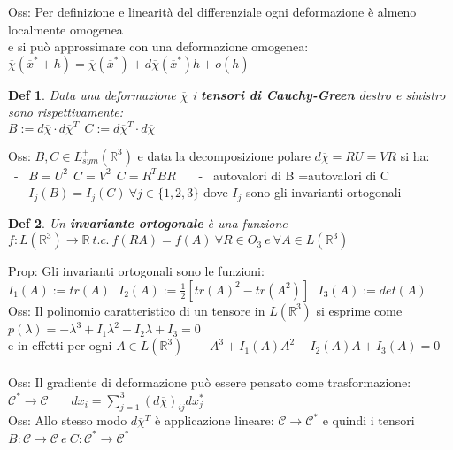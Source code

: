 \documentclass{article}
\theoremstyle{unnumbered}
\newtheorem* {theoremT}{Def}
\theoremstyle{unnumbered1}
\newenvironment{defi}{\begin{gBox}\begin{theoremT}}{\end{theoremT}\end{gBox}}
\begin{document}
%
%
%
Oss: Per definizione e linearità del differenziale ogni deformazione è almeno localmente omogenea\\
\phantom{Oss: }e si può approssimare con una deformazione omogenea: \ $\overline{\chi}(\overline{x}^*+\overline{h})=\overline{\chi}(\overline{x}^*)+d\overline{\chi}(\overline{x}^*)\overline{h} +o(\overline{h})$ \\
%
%
%
\begin{defi}
Data una deformazione $\overline{\chi}$ i \textbf{tensori di Cauchy-Green} destro e sinistro sono rispettivamente:\\
\phantom{DEF: } $B:=d\overline{\chi}\cdot d\overline{\chi}^T \ \ C:=d\overline{\chi}^T\cdot d\overline{\chi} $
\end{defi}
%
Oss: $B,C \in L_{sym}^+(\mathbb{R}^3)$ e data la decomposizione polare $d\overline{\chi}=RU = VR$ si ha: \\
\ - \ $B=U^2 \ \ C=V^2 \ \ C=R^TBR$ \ \
\ - \ autovalori di B =autovalori di C\\
\ - \ $I_j(B)=I_j(C)\ \forall j\in \{1,2,3\}$ dove $I_j$ sono gli invarianti ortogonali \\
%
\begin{defi}
Un \textbf{invariante ortogonale} è una funzione $f:L(\mathbb{R}^3)\rightarrow\mathbb{R} \ t.c. \ f(RA)=f(A) \ \forall R\in O_3 \ e \ \forall A \in L(\mathbb{R}^3)$
\end{defi}
%
Prop: Gli invarianti ortogonali sono le funzioni: \ $I_1(A):=tr(A) \ \ \ I_2(A):=\frac{1}{2}[tr(A)^2-tr(A^2)] \ \ \ I_3(A):=det(A)$ \\
%
Oss: Il polinomio caratteristico di un tensore in $L(\mathbb{R}^3)$ si esprime come $p(\lambda)=-\lambda^3+I_1\lambda^2-I_2\lambda+I_3=0$\\
\phantom{Oss: }e in effetti per ogni $A\in L(\mathbb{R}^3)$ \ \ $-A^3+I_1(A)A^2-I_2(A)A+I_3(A)=0$\\ \\
%
%
%
Oss: Il gradiente di deformazione può essere pensato come trasformazione: $\mathcal{C}^*\rightarrow\mathcal{C}$ \ \ \ $dx_i=\sum_{j=1}^3(d\overline{\chi})_{ij} dx^*_j$ \\
Oss: Allo stesso modo $d\overline{\chi}^T$ è applicazione lineare: $\mathcal{C}\rightarrow\mathcal{C}^*$ e quindi i tensori \ \ $B: \mathcal{C}\rightarrow\mathcal{C} \ e \ C: \mathcal{C}^*\rightarrow\mathcal{C}^*$\\  
%
%
%
\end{document}
